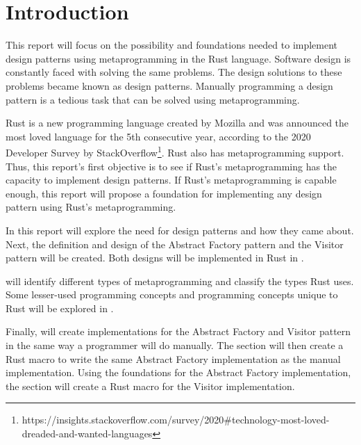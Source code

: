 \section{Introduction}
This report will focus on the possibility and foundations needed to implement design patterns using metaprogramming in the Rust language.
Software design is constantly faced with solving the same problems.
The design solutions to these problems became known as design patterns.
Manually programming a design pattern is a tedious task that can be solved using metaprogramming.

Rust is a new programming language created by Mozilla and was announced the most loved language for the 5th consecutive year, according to the 2020 Developer Survey by StackOverflow\footnote{https://insights.stackoverflow.com/survey/2020\#technology-most-loved-dreaded-and-wanted-languages}.
Rust also has metaprogramming support.
Thus, this report's first objective is to see if Rust's metaprogramming has the capacity to implement design patterns.
If Rust's metaprogramming is capable enough, this report will propose a foundation for implementing any design pattern using Rust's metaprogramming.

In  this report will explore the need for design patterns and how they came about.
Next, the definition and design of the Abstract Factory pattern and the Visitor pattern will be created.
Both designs will be implemented in Rust in .

 will identify different types of metaprogramming and classify the types Rust uses.
Some lesser-used programming concepts and programming concepts unique to Rust will be explored in .

Finally,  will create implementations for the Abstract Factory and Visitor pattern in the same way a programmer will do manually.
The section will then create a Rust macro to write the same Abstract Factory implementation as the manual implementation.
Using the foundations for the Abstract Factory implementation, the section will create a Rust macro for the Visitor implementation.